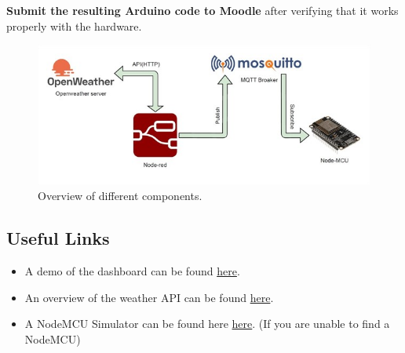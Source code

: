 \documentclass[11pt,letterpaper]{article}
\begin{document}
\noindent \textbf{Submit the resulting Arduino code to Moodle} after verifying that it works properly with the hardware.

\begin{figure}[h]
    \centering
    \includegraphics[width=1\columnwidth]{images/assign2-node-mcu-weather-integration.jpg}
    \caption{Overview of different components.} \label{fig:node-mcu-weather-integration}
\end{figure}

\subsection*{Useful Links}
\begin{itemize}
    \item A demo of the dashboard can be found \href{https://dms.uom.lk/s/yxnzNfEZcHHqRmo}{here}.
    \item An overview of the weather API can be found \href{https://dms.uom.lk/s/iQTGPT7eNDKoJYy}{here}. 
    \item A NodeMCU Simulator can be found here \href{https://wokwi.com/projects/322410731508073042}{here}. (If you are unable to find a NodeMCU)
\end{itemize}

 




\newpage
\end{document}
